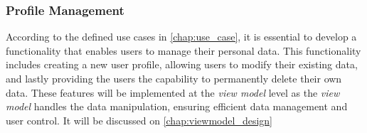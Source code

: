 \subsubsection{Profile Management}
According to the defined use cases in \autoref{chap:use_case}, it is essential to develop a functionality that enables users to manage their personal data. This functionality includes creating a new user profile, allowing users to modify their existing data, and lastly providing the users the capability to permanently delete their own data. These features will be implemented at the \emph{view model} level as the \emph{view model} handles the data manipulation, ensuring efficient data management and user control.
It will be discussed on \autoref{chap:viewmodel_design}



